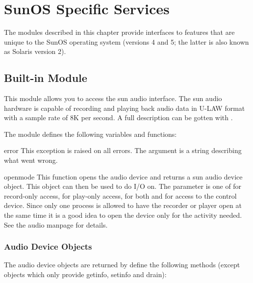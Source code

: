 \chapter{SunOS Specific Services}

The modules described in this chapter provide interfaces to features
that are unique to the SunOS operating system (versions 4 and 5; the
latter is also known as Solaris version 2).

\section{Built-in Module }
\label{module-sunaudiodev}

This module allows you to access the sun audio interface. The sun
audio hardware is capable of recording and playing back audio data
in U-LAW format with a sample rate of 8K per second. A full
description can be gotten with .

The module defines the following variables and functions:

\begin{excdesc}{error}
This exception is raised on all errors. The argument is a string
describing what went wrong.
\end{excdesc}

\begin{funcdesc}{open}{mode}
This function opens the audio device and returns a sun audio device
object. This object can then be used to do I/O on. The  parameter
is one of  for record-only access,  for play-only
access,  for both and  for access to the
control device. Since only one process is allowed to have the recorder
or player open at the same time it is a good idea to open the device
only for the activity needed. See the audio manpage for details.
\end{funcdesc}

\subsection{Audio Device Objects}

The audio device objects are returned by  define the
following methods (except  objects which only provide
getinfo, setinfo and drain):


